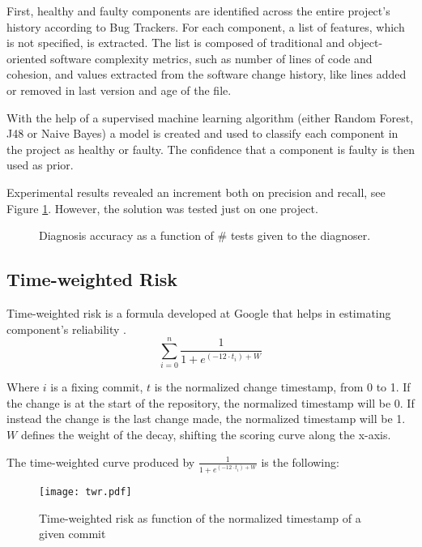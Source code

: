 First, healthy and faulty components are identified across the entire project's history according to Bug Trackers. For each component, a list of features, which is not specified, is extracted. The list is composed of traditional and object-oriented software complexity metrics, such as number of lines of code and cohesion, and values extracted from the software change history, like lines added or removed in last version and age of the file.

With the help of a supervised machine learning algorithm (either Random Forest, J48 or Naive Bayes) a model is created and used to classify each component in the project as healthy or faulty. The confidence that a component is faulty is then used as prior.

Experimental results revealed an increment both on precision and recall, see Figure \ref{fig:elmishali}. However, the solution was tested just on one project.
%
\begin{figure}%
    \centering
    \qquad
    \caption{Diagnosis accuracy as a function of \# tests given to the diagnoser. \cite{Elmishali}}%
    \label{fig:elmishali}%
\end{figure}

\subsection{Time-weighted Risk}

Time-weighted risk is a formula developed at Google that helps in estimating component's reliability \cite{Lewis}. 
%
\begin{equation}
  \sum_{i=0}^{n}  \frac {1} {1 + e^{(-12 \cdot t_i) + W}}
\end{equation}

Where $i$ is a fixing commit, $t$ is the normalized change timestamp, from 0 to 1. If the change is at the start of the repository, the normalized timestamp will be 0. If instead the change is the last change made, the normalized timestamp will be 1. $W$ defines the weight of the decay, shifting the scoring curve along the x-axis.

The time-weighted curve produced by $\frac {1} {1 + e^{(-12 \cdot t_i) + W}}$ is the following:
%
\begin{figure}[H]
  \begin{center}
    \leavevmode
    \texttt{[image: twr.pdf]}
    \caption{Time-weighted risk as function of the normalized timestamp of a given commit}
    \label{fig:crowbar-sunburst}
  \end{center}
\end{figure}